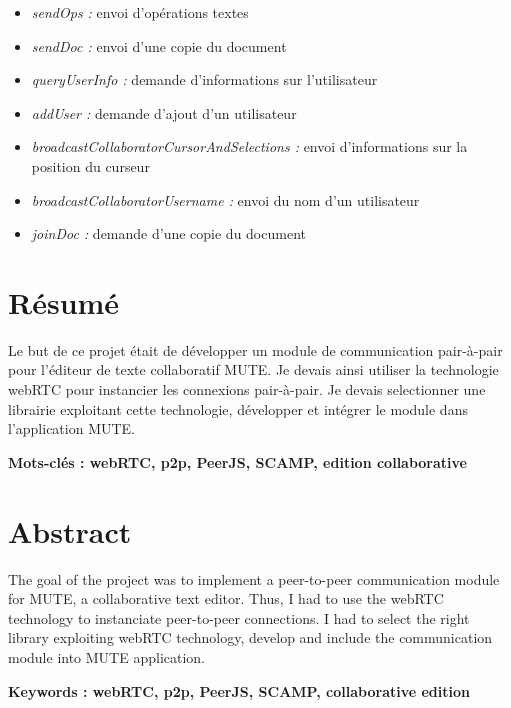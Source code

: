 \documentclass{tnreport}
\begin{document}
\begin{itemize}
  \item \emph{sendOps : } envoi d'opérations textes
  \item \emph{sendDoc : } envoi d'une copie du document
  \item \emph{queryUserInfo : } demande d'informations sur l'utilisateur
  \item \emph{addUser : } demande d'ajout d'un utilisateur
  \item \emph{broadcastCollaboratorCursorAndSelections : } envoi d'informations sur la position du curseur
  \item \emph{broadcastCollaboratorUsername : } envoi du nom d'un utilisateur
  \item \emph{joinDoc : } demande d'une copie du document
\end{itemize}


\cleardoublepage
\thispagestyle{empty}

\section*{Résumé}

Le but de ce projet était de développer un module de communication pair-à-pair pour l'éditeur de texte collaboratif MUTE. Je devais ainsi utiliser la technologie webRTC pour instancier les connexions pair-à-pair. Je devais selectionner une librairie exploitant cette technologie, développer  et intégrer le module dans l'application MUTE.

{\bf Mots-clés : webRTC, p2p, PeerJS, SCAMP, edition collaborative}


\section*{Abstract}

The goal of the project was to implement a peer-to-peer communication module for MUTE, a collaborative text editor. Thus, I had to use the webRTC technology to instanciate peer-to-peer connections. I had to select the right library exploiting webRTC technology, develop and include the communication module into MUTE application.

{\bf Keywords : webRTC, p2p, PeerJS, SCAMP, collaborative edition}
\end{document}
